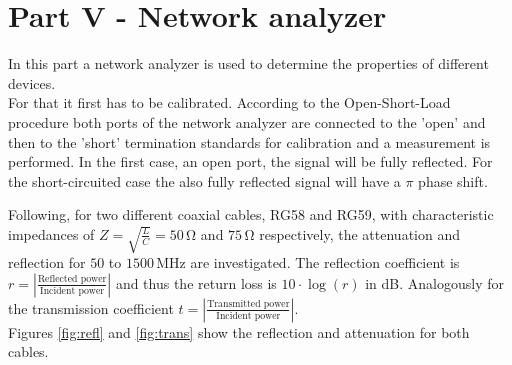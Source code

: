 \section{Part V - Network analyzer}
In this part a network analyzer is used to determine the properties of different devices.\\
For that it first has to be calibrated. According to the Open-Short-Load procedure both ports of the network analyzer are connected to the 'open' and then to the 'short' termination standards for calibration and a measurement is performed. In the first case, an open port, the signal will be fully reflected. For the short-circuited case the also fully reflected signal will have a $\pi$ phase shift.
\par
Following, for two different coaxial cables, RG58 and RG59, with characteristic impedances of $Z=\sqrt{\frac{L}{C}}=50\,\mathrm{\Omega}$ and $75\,\mathrm{\Omega}$ respectively, the attenuation and reflection  for $50$ to $1500\,\mathrm{MHz}$ are investigated.
The reflection coefficient is $r=\left|\frac{\text{Reflected power}}{\text{Incident power}}\right|$ and thus the return loss is $10\cdot\log(r)$ in dB. Analogously for the transmission coefficient $t=\left|\frac{\text{Transmitted power}}{\text{Incident power}}\right|$.\\
Figures \ref{fig:refl} and \ref{fig:trans} show the reflection and attenuation for both cables.
